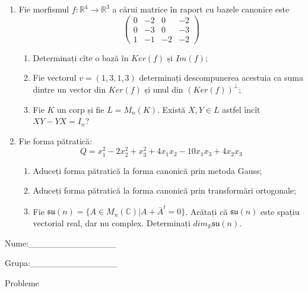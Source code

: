 \documentclass{article}
\begin{document}
\begin{enumerate}
 \item Fie morfismul $f:\mathbb{R}^4 \to \mathbb{R}^3$ a cărui matrice în raport cu bazele canonice este
$$\begin{pmatrix}
0&-2&0&-2\\
0&-3&0&-3\\
1&-1&-2&-2
\end{pmatrix}$$

\begin{enumerate}
\item Determinați cîte o bază în $Ker(f)$ și $Im(f)$;
\item Fie vectorul $v=(1,3,1,3)$ determinați descompunerea acestuia ca suma dintre un vector din $Ker(f)$ și unul din $(Ker(f))^\perp$;
\item Fie $K$ un corp și fie $L=M_n(K)$. Există $X,Y \in L$ astfel încît $XY-YX=I_n$?  
\end{enumerate}
\item Fie forma pătratică:
$$Q= x_1^2-2x_2^2+x_3^2+4x_1x_2-10x_1x_3+4x_2x_3$$

\begin{enumerate}
\item Aduceți forma pătratică la forma canonică prin metoda Gauss;
\item Aduceți forma pătratică la forma canonică prin transformări ortogonale;
\item Fie $\mathfrak{su}(n)=\{ A \in M_n(\mathbb{C}) | A+\bar{A}^t=0\}$. Arătați că $\mathfrak{su}(n)$ este spațiu vectorial real, dar nu complex.
Determinați $dim_{\mathbb{R}}\mathfrak{su}(n)$.
\end{enumerate}
\end{enumerate}
\newpage
\begin{flushright}
Nume:\_\_\_\_\_\_\_\_\_\_\_\_\_\_
 
 
Grupa:\_\_\_\_\_\_\_\_\_\_\_\_\_\_
\end{flushright}
\begin{center}
\vspace{2cm}
{\Large Probleme}
\vspace{2cm}
\end{center}
\end{document}
